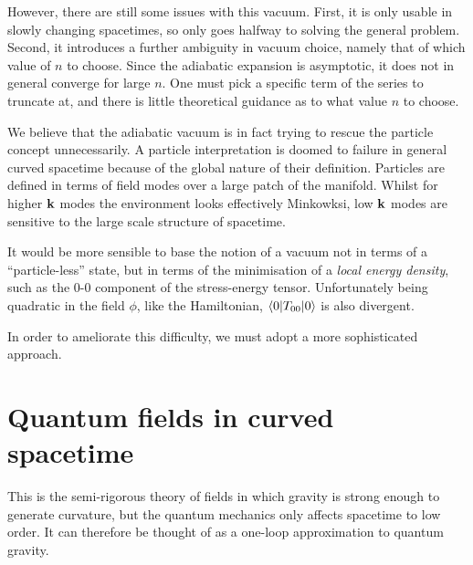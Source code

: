 However, there are still some issues with this vacuum. First, it is only usable in slowly changing spacetimes, so only goes halfway to solving the general problem. Second, it introduces a further ambiguity in vacuum choice, namely that of which value of $n$ to choose. Since the adiabatic expansion is asymptotic, it does not in general converge for large $n$. One must pick a specific term of the series to truncate at, and there is little theoretical guidance as to what value $n$ to choose.

We believe that the adiabatic vacuum is in fact trying to rescue the particle concept unnecessarily. A particle interpretation is doomed to failure in general curved spacetime because of the global nature of their definition. Particles are defined in terms of field modes over a large patch of the manifold. Whilst for higher $\mathbf{k}$ modes the environment looks effectively Minkowksi, low $\mathbf{k}$ modes are sensitive to the large scale structure of spacetime.

It would be more sensible to base the notion of a vacuum not in terms of a ``particle-less'' state, but in terms of the minimisation of a {\em local energy density}, such as the $0$-$0$ component of the stress-energy tensor. Unfortunately being quadratic in the field $\phi$, like the Hamiltonian, $\left\langle0\middle|T_{00}\middle|0\right\rangle$ is also divergent.

In order to ameliorate this difficulty, we must adopt a more sophisticated approach. 

\section{Quantum fields in curved spacetime} 
\label{sec:QFTCST}
This is the semi-rigorous theory of fields in which gravity is strong enough to generate curvature, but the quantum mechanics only affects spacetime to low order. It can therefore be thought of as a one-loop approximation to quantum gravity.

